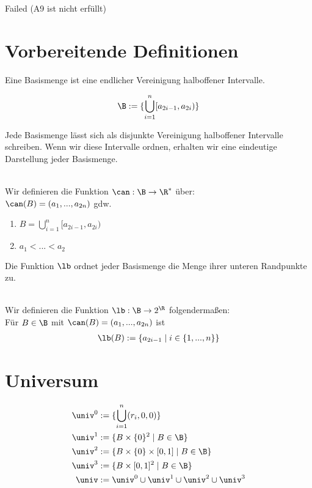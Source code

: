 Failed (A9 ist nicht erfüllt)

\section{Vorbereitende Definitionen}

Eine Basismenge ist eine endlicher Vereinigung halboffener Intervalle.

\begin{dfn}[Basismenge]
    \begin{align*}
        \B := \{ \bigcup_{i=1}^{n} [a_{2i-1},a_{2i}) \}
    \end{align*}
\end{dfn}

Jede Basismenge lässt sich als disjunkte Vereinigung halboffener Intervalle schreiben.
Wenn wir diese Intervalle ordnen, erhalten wir eine eindeutige Darstellung jeder Basismenge.

\begin{dfn}\ \\
    Wir definieren die Funktion $\can : \B \to \R^*$ über:\\
    $\can(B) = (a_1, ... , a_{2n})$ gdw.
    \begin{enumerate}
        \item $B = \bigcup_{i=1}^{n} [a_{2i-1},a_{2i})$
        \item $a_1 < ... < a_2$
    \end{enumerate}
\end{dfn}

Die Funktion $\lb$ ordnet jeder Basismenge die Menge ihrer unteren Randpunkte zu.

\begin{dfn}\ \\
    Wir definieren die Funktion $\lb : \B \to 2^\R$ folgendermaßen:\\
    Für $B \in \B$ mit $\can(B) = (a_1, ... , a_{2n})$ ist
    \begin{align*}
        \lb(B) := \{a_{2i-1} \mid i \in \{1, ... , n\}\}
    \end{align*}
\end{dfn}



\section{Universum}

\begin{dfn}
    \begin{align*}
        \univ^0 &:= \{\bigcup_{i=1}^{n}(r_i,0,0)\}\\
        \univ^1 &:= \{B \times \{0\}^2 \mid B \in \B\}\\
        \univ^2 &:= \{B \times \{0\} \times [0,1] \mid B \in \B\}\\
        \univ^3 &:= \{B \times [0,1]^2 \mid B \in \B\}\\
        \univ &:= \univ^0 \cup \univ^1 \cup \univ^2 \cup \univ^3
    \end{align*}
\end{dfn}

